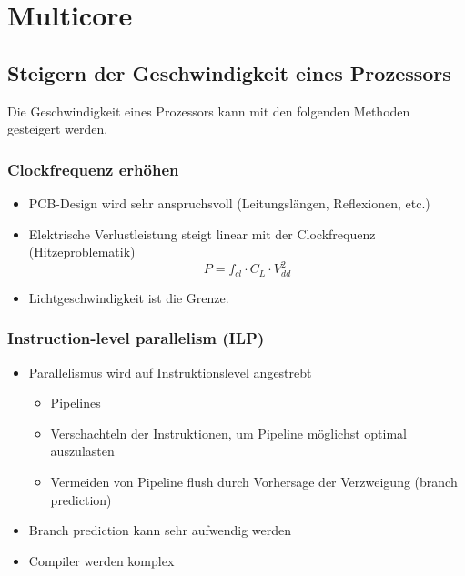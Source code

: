 \section{Multicore}
\subsection{Steigern der Geschwindigkeit eines Prozessors}
Die Geschwindigkeit eines Prozessors kann mit den folgenden Methoden gesteigert werden.

\subsubsection{Clockfrequenz erhöhen}
\begin{itemize}
	\item PCB-Design wird sehr anspruchsvoll  (Leitungslängen, Reflexionen, etc.)
	\item Elektrische Verlustleistung steigt linear mit der Clockfrequenz (Hitzeproblematik)
	\begin{equation}
		P = f_{cl} \cdot C_L \cdot V_{dd}^2
	\end{equation}
	\item Lichtgeschwindigkeit ist die Grenze.
\end{itemize}

\subsubsection{Instruction-level parallelism (ILP)}
\begin{itemize}
	\item Parallelismus wird auf Instruktionslevel angestrebt 
	\begin{itemize}
		\item Pipelines
		\item Verschachteln der Instruktionen, um Pipeline möglichst optimal auszulasten 
		\item Vermeiden von Pipeline flush durch Vorhersage der Verzweigung (branch prediction) 
	\end{itemize}
	\item Branch prediction kann sehr aufwendig werden 
	\item Compiler werden komplex
\end{itemize}

